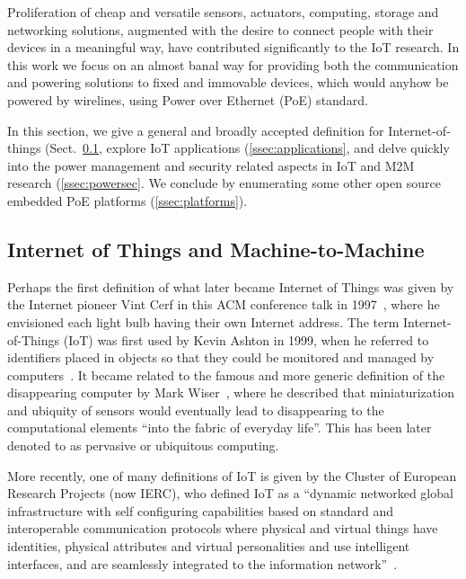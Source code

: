 \documentclass{siamltex}
\begin{document}
Proliferation of cheap and versatile sensors, actuators, computing, storage and
networking solutions, augmented with the desire to connect people with their
devices in a meaningful way, have contributed significantly to the IoT
research. 
In this work we focus on an
almost banal way for providing both the communication and powering solutions to
fixed and immovable devices, which would anyhow be powered by wirelines, using
Power over Ethernet (PoE) standard. 

In this section, we give a general and broadly accepted definition for
Internet-of-things (Sect.~\ref{ssec:definition}, explore IoT
applications (\ref{ssec:applications}, and delve quickly into the
power management and security related aspects in IoT and M2M research
(\ref{ssec:powersec}.  We conclude by enumerating some
other open source embedded PoE platforms (\ref{ssec:platforms}).


\subsection{Internet of Things and Machine-to-Machine}
\label{ssec:definition}

Perhaps the first definition of what later became Internet of Things
was given by the Internet pioneer Vint Cerf in this ACM conference
talk in 1997~\cite{cerf1997next}, where he envisioned each light bulb
having their own Internet address.
The term Internet-of-Things (IoT) was first used
by Kevin Ashton in 1999, when he referred to identifiers
placed in objects so that they could be monitored and managed by
computers~\cite{ashton2009internet}.  It
became related to the famous and more generic definition of the
disappearing computer by Mark Wiser~\cite{weiser1991computer}, where he
described that miniaturization and ubiquity of sensors would
eventually lead to disappearing to the computational elements ``into
the fabric of everyday life''.  This has been later denoted to as
pervasive or ubiquitous computing.

More recently, one of many definitions of IoT is given by the Cluster
of European Research
Projects (now IERC), who defined IoT as a ``dynamic networked global
infrastructure with self configuring capabilities based on standard
and interoperable communication protocols where physical and virtual
things have identities, physical attributes and virtual personalities
and use intelligent interfaces, and are seamlessly integrated to the
information network''~\cite{vermesan2011internet}.
\end{document}
